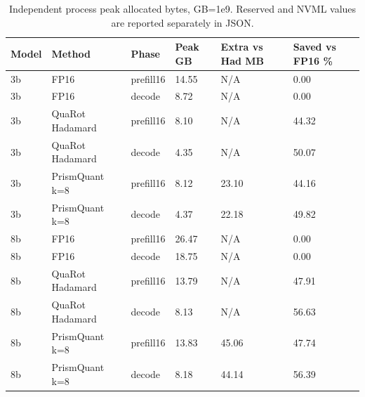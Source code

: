 \begin{table}[t]
\centering
\small
\caption{Independent process peak allocated bytes, GB=1e9. Reserved and NVML values are reported separately in JSON.}
\begin{tabular}{llllll}
\toprule
Model & Method & Phase & Peak GB & Extra vs Had MB & Saved vs FP16 \% \\
\midrule
3b & FP16 & prefill16 & 14.55 & N/A & 0.00 \\
3b & FP16 & decode & 8.72 & N/A & 0.00 \\
3b & QuaRot Hadamard & prefill16 & 8.10 & N/A & 44.32 \\
3b & QuaRot Hadamard & decode & 4.35 & N/A & 50.07 \\
3b & PrismQuant k=8 & prefill16 & 8.12 & 23.10 & 44.16 \\
3b & PrismQuant k=8 & decode & 4.37 & 22.18 & 49.82 \\
8b & FP16 & prefill16 & 26.47 & N/A & 0.00 \\
8b & FP16 & decode & 18.75 & N/A & 0.00 \\
8b & QuaRot Hadamard & prefill16 & 13.79 & N/A & 47.91 \\
8b & QuaRot Hadamard & decode & 8.13 & N/A & 56.63 \\
8b & PrismQuant k=8 & prefill16 & 13.83 & 45.06 & 47.74 \\
8b & PrismQuant k=8 & decode & 8.18 & 44.14 & 56.39 \\
\bottomrule
\end{tabular}
\end{table}
